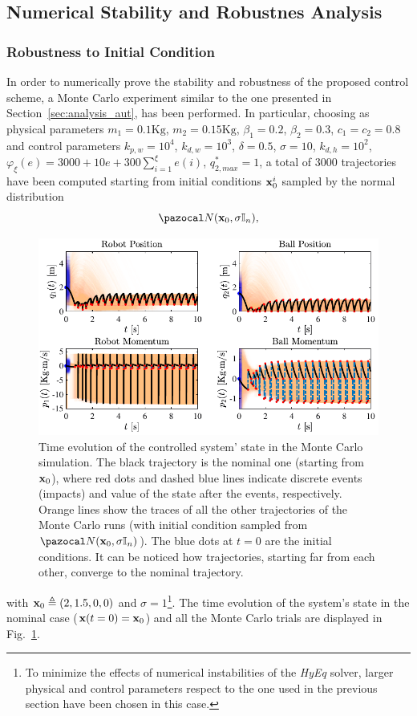 \subsection{Numerical Stability and Robustnes Analysis}
%
\subsubsection{Robustness to Initial Condition}
In order to numerically prove the stability and robustness of the proposed control scheme, a Monte Carlo experiment similar to the one presented in Section~\ref{sec:analysis_aut}, has been performed. In particular, choosing as physical parameters $m_1=0.1\text{Kg}$, $m_2=0.15\text{Kg}$, $\beta_1=0.2$, $\beta_2=0.3$, $c_1=c_2=0.8$ and control parameters $k_{p,w} = 10^4$, $k_{d,w} = 10^3$, $\delta = 0.5$, $\sigma = 10$, $k_{d,h} = 10^2$, $\varphi_\xi(e) = 3000 + 10e + 300\sum_{i = 1}^{\xi}e(i)$, $q_{2,max}^* = 1$, a total of 3000 trajectories have been computed starting from initial conditions $\mathbf{x}_0^i$ sampled by the normal distribution
%
\begin{equation}
\N(\xb_0,\sigma\mathbb{I}_n),
\end{equation}
\begin{figure}[t!]
	\centering
	\includegraphics[width = \linewidth]{Figures/reg1.pdf}
	\caption[Time evolution of the controlled system' state in the Monte Carlo simulation]{Time evolution of the controlled system' state in the Monte Carlo simulation. The black trajectory is the nominal one (starting from $\mathbf{x}_0$), where red dots and dashed blue lines indicate discrete events (impacts) and value of the state after the events, respectively. Orange lines show the traces of all the other trajectories of the Monte Carlo runs (with initial condition sampled from $\N(\xb_0,\sigma\mathbb{I}_n)$). The blue dots at $t=0$ are the initial conditions. It can be noticed how trajectories, starting far from each other, converge to the nominal trajectory.}
	\label{fig:reg1}
\end{figure}
with $\mathbf{x}_0\triangleq(2,1.5,0,0)$ and $\sigma=1$\footnote{To minimize the effects of numerical instabilities of the \textit{HyEq} solver, larger physical and control parameters respect to the one used in the previous section have been chosen in this case.}. The time evolution of the system's state in the nominal case ($\mathbf{x}(t=0) = \mathbf{x}_0$) and all the Monte Carlo trials are displayed in Fig.~\ref{fig:reg1}.


